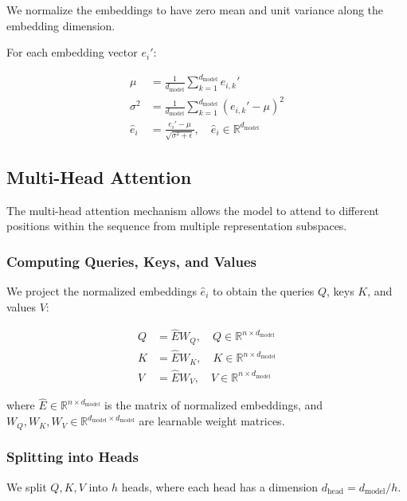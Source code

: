 \documentclass{article}
\begin{document}
We normalize the embeddings to have zero mean and unit variance along the embedding dimension.

For each embedding vector \( e_i' \):

\begin{align*}
    \mu &= \frac{1}{d_{\text{model}}} \sum_{k=1}^{d_{\text{model}}} e_{i, k}' \\
    \sigma^2 &= \frac{1}{d_{\text{model}}} \sum_{k=1}^{d_{\text{model}}} (e_{i, k}' - \mu)^2 \\
    \hat{e}_i &= \frac{e_i' - \mu}{\sqrt{\sigma^2 + \epsilon}}, \quad \hat{e}_i \in \mathbb{R}^{d_{\text{model}}}
\end{align*}

\subsection{Multi-Head Attention}

The multi-head attention mechanism allows the model to attend to different positions within the sequence from multiple representation subspaces.

\subsubsection{Computing Queries, Keys, and Values}

We project the normalized embeddings \( \hat{e}_i \) to obtain the queries \( Q \), keys \( K \), and values \( V \):

\begin{align*}
    Q &= \hat{E} W_Q, \quad Q \in \mathbb{R}^{n \times d_{\text{model}}} \\
    K &= \hat{E} W_K, \quad K \in \mathbb{R}^{n \times d_{\text{model}}} \\
    V &= \hat{E} W_V, \quad V \in \mathbb{R}^{n \times d_{\text{model}}}
\end{align*}

where \( \hat{E} \in \mathbb{R}^{n \times d_{\text{model}}} \) is the matrix of normalized embeddings, and \( W_Q, W_K, W_V \in \mathbb{R}^{d_{\text{model}} \times d_{\text{model}}} \) are learnable weight matrices.

\subsubsection{Splitting into Heads}

We split \( Q, K, V \) into \( h \) heads, where each head has a dimension \( d_{\text{head}} = d_{\text{model}} / h \).
\end{document}
